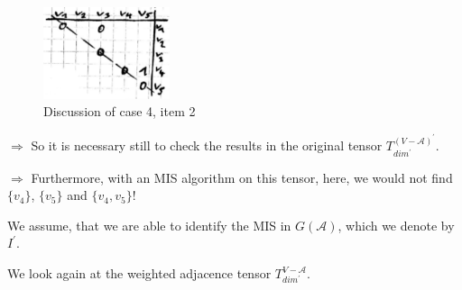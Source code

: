 \documentclass{article}
\newtheorem*{theorem A}{Theorem A}
\newtheorem*{theorem B}{N\"olker's Theorem}
\theoremstyle{remark}
\theoremstyle{remark}
\begin{document}
\begin{enumerate}
        \begin{figure}[ht]
	        \centering
            \includegraphics[width=0.33\textwidth]{images/discussionCase4Item2.png}
	        \caption{Discussion of case 4, item 2}
	    \label{fig:case4disitem2}
        \end{figure}

        \vspace{0.3cm}
        $\Rightarrow$ So it is necessary still to check the results in the original tensor $T^{\left(V - \mathcal{A}\right)^{\prime}}_{dim^{\prime}}$.

        \vspace{0.3cm}
        $\Rightarrow$ Furthermore, with an MIS algorithm on this tensor, here, we would not find $\{ v_{4} \}$, $\{ v_{5} \}$ and $\{ v_{4}, v_{5} \}$!
\label{enum:disccase4}
\end{enumerate}


\vspace{0.3cm}
We assume, that we are able to identify the MIS in $G\left(\mathcal{A}\right)$, which we denote by $I^{\prime}$.

\vspace{0.3cm}
We look again at the weighted adjacence tensor $T^{V - \mathcal{A}}_{dim^{\prime}}$.
\end{document}
